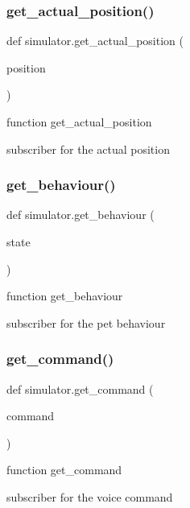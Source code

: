 \subsubsection{\texorpdfstring{get\+\_\+actual\+\_\+position()}{get\_actual\_position()}}
{\footnotesize\ttfamily def simulator.\+get\+\_\+actual\+\_\+position (\begin{DoxyParamCaption}\item[{}]{position }\end{DoxyParamCaption})}



function get\+\_\+actual\+\_\+position 

subscriber for the actual position \mbox{\label{namespacesimulator_affbc3bee7f4b28215c4fe9e5e9e01003}} 
\subsubsection{\texorpdfstring{get\+\_\+behaviour()}{get\_behaviour()}}
{\footnotesize\ttfamily def simulator.\+get\+\_\+behaviour (\begin{DoxyParamCaption}\item[{}]{state }\end{DoxyParamCaption})}



function get\+\_\+behaviour 

subscriber for the pet behaviour \mbox{\label{namespacesimulator_a06561cb374c45cd36cb7f77886cc7a7f}} 
\subsubsection{\texorpdfstring{get\+\_\+command()}{get\_command()}}
{\footnotesize\ttfamily def simulator.\+get\+\_\+command (\begin{DoxyParamCaption}\item[{}]{command }\end{DoxyParamCaption})}



function get\+\_\+command 

subscriber for the voice command \mbox{\label{namespacesimulator_ad83902aab63958c0d241d17880635167}} 
